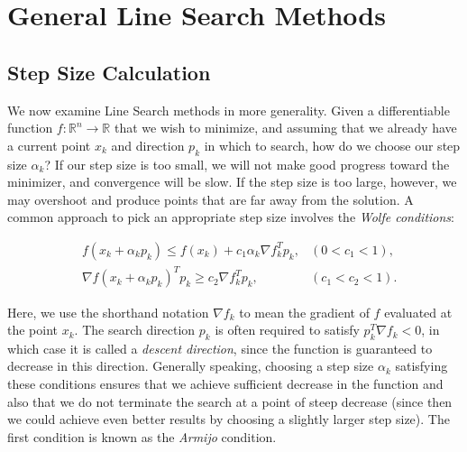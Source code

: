 \section*{General Line Search Methods}
\subsection*{Step Size Calculation}
We now examine Line Search methods in more generality. Given a differentiable function
$f : \mathbb{R}^n \rightarrow \mathbb{R}$ that we wish to minimize, and assuming that
we already have a current point $x_k$ and direction $p_k$ in which to search, how do we
choose our step size $\alpha_k$? If our step size is too small, we will not make good progress
toward the minimizer, and convergence will be slow. If the step size is too large, however,
we may overshoot and produce points that are far away from the solution.
A common approach to pick an appropriate step size involves the \emph{Wolfe conditions}:

\begin{align*}
&f(x_k + \alpha_kp_k) \leq f(x_k) + c_1\alpha_k\nabla f_k^Tp_k, &(0 < c_1 < 1),
\\ &\nabla f(x_k + \alpha_kp_k)^Tp_k \geq c_2\nabla f_k^Tp_k, &(c_1 < c_2 < 1).
\end{align*}

Here, we use the shorthand notation $\nabla f_k$ to
mean the gradient of $f$ evaluated at the point $x_k$. The search direction $p_k$ is
often required to satisfy $p_k^T \nabla f_k < 0$, in which case it is called a
\emph{descent direction}, since the function is guaranteed to decrease in
this direction. Generally speaking, choosing a step size $\alpha_k$ satisfying these conditions
ensures that we achieve sufficient decrease in the function and also that we do not
terminate the search at a point of steep decrease (since then we could achieve even
better results by choosing a slightly larger step size). The first condition is known
as the \emph{Armijo} condition.

